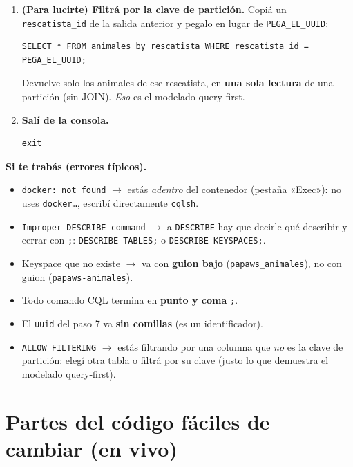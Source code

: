 \documentclass[11pt,a4paper]{article}
\begin{document}
\begin{enumerate}[leftmargin=1.6em]
  \item \textbf{(Para lucirte) Filtrá por la clave de partición.} Copiá un \texttt{rescatista\_id} de la salida anterior y pegalo en lugar de \texttt{PEGA\_EL\_UUID}:
  \begin{lstlisting}[style=shell]
SELECT * FROM animales_by_rescatista WHERE rescatista_id = PEGA_EL_UUID;
  \end{lstlisting}
  {\footnotesize Devuelve solo los animales de ese rescatista, en \textbf{una sola lectura} de una partición (sin JOIN). \emph{Eso} es el modelado query-first.}

  \item \textbf{Salí de la consola.}
  \begin{lstlisting}[style=shell]
exit
  \end{lstlisting}
\end{enumerate}

\begin{nota}
\textbf{Si te trabás (errores típicos).}
\begin{itemize}[leftmargin=1.4em, nosep]
  \item \texttt{docker: not found} $\rightarrow$ estás \emph{adentro} del contenedor
        (pestaña «Exec»): no uses \texttt{docker\ldots}, escribí directamente
        \texttt{cqlsh}.
  \item \texttt{Improper DESCRIBE command} $\rightarrow$ a \texttt{DESCRIBE} hay que
        decirle qué describir y cerrar con \texttt{;}: \texttt{DESCRIBE TABLES;} o
        \texttt{DESCRIBE KEYSPACES;}.
  \item Keyspace que no existe $\rightarrow$ va con \textbf{guion bajo}
        (\texttt{papaws\_animales}), no con guion (\texttt{papaws-animales}).
  \item Todo comando CQL termina en \textbf{punto y coma} \texttt{;}.
  \item El \texttt{uuid} del paso 7 va \textbf{sin comillas} (es un identificador).
  \item \texttt{ALLOW FILTERING} $\rightarrow$ estás filtrando por una columna que
        \emph{no} es la clave de partición: elegí otra tabla o filtrá por su clave
        (justo lo que demuestra el modelado query-first).
\end{itemize}
\end{nota}

\section{Partes del código fáciles de cambiar (en vivo)}
\label{sec:cambios}
\end{document}
